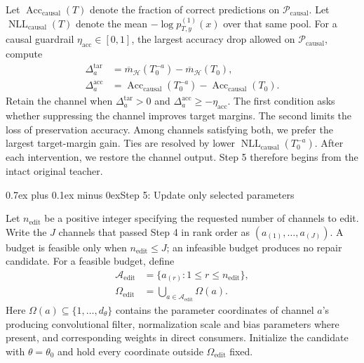 \documentclass[10pt,journal,compsoc]{IEEEtran}
\makeatletter
\def\subsection{\@startsection{subsection}{2}{\z@}{-3.5ex plus -0.5ex minus -1.5ex}%
{0.7ex plus 0.1ex minus 0ex}{\normalfont\normalsize\sffamily\bfseries}}
\theoremstyle{definition}
\makeatother
\begin{document}
Let $\operatorname{Acc}_{\mathrm{causal}}(T)$ denote the
fraction of correct predictions on
$\mathcal P_{\mathrm{causal}}$. Let
$\operatorname{NLL}_{\mathrm{causal}}(T)$ denote the mean
$-\log p_{T,y}^{(1)}(x)$ over that same pool.
For a causal guardrail $\eta_{\mathrm{acc}}\in[0,1]$, the largest
accuracy drop allowed on $\mathcal P_{\mathrm{causal}}$, compute
\begin{equation}
\label{eq:repair-causal-gate}
\begin{aligned}
\Delta_a^{\mathrm{tar}}
&=\overline m_{\mathcal H}(T_0^{-a})
 -\overline m_{\mathcal H}(T_0),\\
\Delta_a^{\mathrm{acc}}
&=\operatorname{Acc}_{\mathrm{causal}}(T_0^{-a})
 -\operatorname{Acc}_{\mathrm{causal}}(T_0).
\end{aligned}
\end{equation}
Retain the channel when $\Delta_a^{\mathrm{tar}}>0$ and
$\Delta_a^{\mathrm{acc}}\geq-\eta_{\mathrm{acc}}$.
The first condition asks whether suppressing the channel
improves target margins. The second limits the loss of
preservation accuracy. Among channels satisfying both,
we prefer the largest target-margin gain. Ties are resolved
by lower $\operatorname{NLL}_{\mathrm{causal}}(T_0^{-a})$.
After each intervention, we restore the channel output.
Step 5 therefore begins from the intact original teacher.

\vspace{-5pt}
\subsection{Step 5: Update only selected parameters}

Let $n_{\mathrm{edit}}$ be a positive integer specifying the
requested number of channels to edit. Write the $J$ channels
that passed Step 4 in rank order as
$(a_{(1)},\ldots,a_{(J)})$. A budget is feasible only when
$n_{\mathrm{edit}}\leq J$; an infeasible budget produces no
repair candidate. For a feasible budget, define
\begin{equation}
\label{eq:repair-edit-support}
\begin{aligned}
\mathcal A_{\mathrm{edit}}
&=\{a_{(r)}:1\leq r\leq n_{\mathrm{edit}}\},\\
\Omega_{\mathrm{edit}}
&=\bigcup_{a\in\mathcal A_{\mathrm{edit}}}\Omega(a).
\end{aligned}
\end{equation}
Here $\Omega(a)\subseteq\{1,\ldots,d_\theta\}$ contains the
parameter coordinates of channel $a$'s producing
convolutional filter, normalization scale and bias
parameters where present, and corresponding weights in
direct consumers. Initialize the candidate with
$\theta=\theta_0$ and hold every coordinate outside
$\Omega_{\mathrm{edit}}$ fixed.
\end{document}

